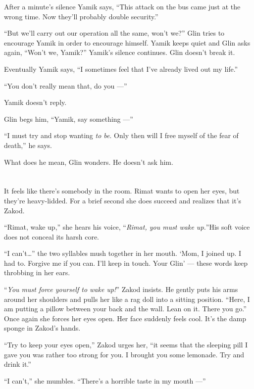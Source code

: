 \documentclass[twoside,11pt]{book}
\begin{document}
After a minute's silence Yamik says, ``This attack on the bus came just at the wrong time. Now they'll
probably double security.''

``But we'll carry out our operation all the same, won't we?'' Glin tries to encourage Yamik in
order to encourage himself. Yamik keeps quiet and Glin asks again, ``Won't we, Yamik?''
Yamik's silence continues. Glin doesn't break it.

Eventually Yamik says, ``I sometimes feel that I've already lived out my life.''

``You don't really mean that, do you ---''

Yamik doesn't reply.

Glin begs him, ``Yamik, say something ---''

``I must try and stop wanting \textit{to be}. Only then will I free myself of the fear of
death,'' he says.

What does he mean,  Glin wonders.  He doesn't ask him.


\bigskip

\chapter{}

It feels like there's somebody in the room. Rimat wants to open her eyes, but they're heavy-lidded. For a brief
second she does succeed and realizes that it's Zakod.

``Rimat, wake up,'' she hears his voice, ``\textit{Rimat, you must wake up.}{}''His soft voice
does not conceal its harsh core.

``I can't{\ldots}''  the two syllables mush together in her mouth. `Mom, I joined up. I had to. Forgive me if you
can. I'll keep in touch. Your Glin' --- these  words  keep  throbbing  in her ears.

{}``\textit{You must force yourself to wake up!}{}'' \textit{ } Zakod insists. He gently puts his arms around her
shoulders and pulls her like a rag doll into a sitting position. ``Here, I am putting a pillow between your back and
the wall. Lean on it. There you go.{}'' Once again she forces her eyes open. Her face suddenly feels cool.
It's   the damp sponge in Zakod's hands.

``Try to keep your eyes open,'' Zakod urges her, ``it seems that the sleeping pill I gave you was rather too strong
for you. I brought you some lemonade. Try and drink it.''

``I can't,'' she mumbles. ``There's a horrible taste in my mouth ---''
\end{document}

